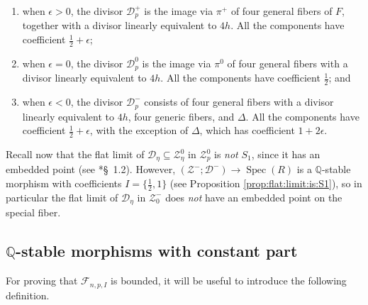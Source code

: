 \documentclass{amsart}
\newcommand{\bQ}{\mathbb{Q}}
\newcommand{\sF}{\mathscr{F}}
\newcommand{\cD}{\mathcal{D}}
\newcommand{\cZ}{\mathcal{Z}}
\newcommand{\spec}{\operatorname{Spec}}
\theoremstyle{definition}
\begin{document}
\begin{enumerate}
\item when $\epsilon > 0$, the divisor $\cD^+_p$ is the image via $\pi^+$ of four general fibers of $F$, together with a divisor linearly equivalent to $4h$.
All the components have coefficient $\frac{1}{2} + \epsilon$;
\item when $\epsilon = 0$, the divisor $\cD^0_p$ is the image via $\pi^0$ of four general fibers with a divisor linearly equivalent to $4h$.
All the components have coefficient $\frac{1}{2}$; and
\item when $\epsilon < 0$, the divisor $\cD^-_p$ consists of four general fibers with a divisor linearly equivalent to $4h$, four generic fibers, and $\Delta$.
All the components have coefficient $\frac{1}{2} + \epsilon$, with the exception of $\Delta$, which has coefficient $1+2\epsilon$.
\end{enumerate}


Recall now that the flat limit of $\cD_{\eta}\subseteq \cZ^0_\eta$ in $\cZ^0_p$ is \emph{not} $S_1$, since it has an embedded point (see \cite{KP17}*{\S~1.2}).
However, $(\cZ^-;\cD^-)\to \spec(R)$ is a $\bQ$-stable morphism with coefficients $I = \{\frac{1}{2}, 1\}$ (see Proposition \ref{prop:flat:limit:is:S1}), so in particular the flat limit of $\cD_\eta$ in $\cZ_0^-$ does \emph{not} have an embedded point on the special fiber.


\subsection{$\bQ$-stable morphisms with constant part}\label{sec_constant_part}
For proving that $\sF_{n,p,I}$ is bounded, it will be useful to introduce the following definition.
\end{document}
